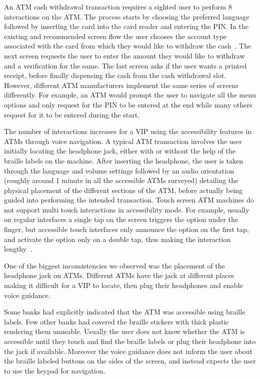 An ATM cash withdrawal transaction requires a sighted user to perform 8 interactions on the ATM. The process starts by choosing the preferred language followed by inserting the card into the card reader and entering the PIN. In the existing and recommended screen flow the user chooses the account type associated with the card from which they would like to withdraw the cash~\cite{IBA2013b}. The next screen requests the user to enter the amount they would like to withdraw and a verification for the same. The last screen asks if the user wants a printed receipt, before finally dispensing the cash from the cash withdrawal slot. However, different ATM manufacturers implement the same series of screens differently. For example, an ATM would prompt the user to navigate all the menu options and only request for the PIN to be entered at the end while many others request for it to be entered during the start. 

The number of interactions increases for a VIP using the accessibility features in ATMs through voice navigation. A typical ATM transaction involves the user initially locating the headphone jack, either with or without the help of the braille labels on the machine. After inserting the headphone, the user is taken through the language and volume settings followed by an audio orientation (roughly around 1 minute in all the accessible ATMs surveyed) detailing the physical placement of the different sections of the ATM, before actually being guided into performing the intended transaction. Touch screen ATM machines do not support multi touch interactions in accessibility mode. For example, usually on regular interfaces a single tap on the screen triggers the option under the finger, but accessible touch interfaces only announce the option on the first tap, and activate the option only on a double tap, thus making the interaction lengthy~\cite{kane2008slide}.

One of the biggest inconsistencies we observed was the placement of the headphone jack on ATMs. Different ATMs have the jack at different places making it difficult for a VIP to locate, then plug their headphones and enable voice guidance.

Some banks had explicitly indicated that the ATM was accessible using braille labels. Few other banks had covered the braille stickers with thick plastic rendering them unusable. Usually the user does not know whether the ATM is accessible until they touch and find the braille labels or plug their headphone into the jack if available. Moreover the voice guidance does not inform the user about the braille labeled buttons on the sides of the screen, and instead expects the user to use the keypad for navigation.


